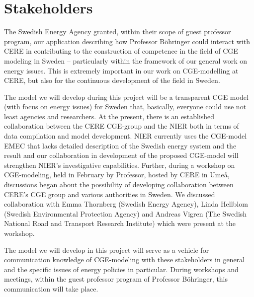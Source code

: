 \section{Stakeholders}
The Swedish Energy Agency granted, within their scope of guest professor program, our application describing how Professor Böhringer could interact with CERE in contributing to the construction of competence in the field of CGE modeling in Sweden – particularly within the framework of our general work on energy issues. This is extremely important in our work on CGE-modelling at CERE, but also for the continuous development of the field in Sweden.

The model we will develop during this project will be a transparent CGE model (with focus on energy issues) for Sweden that, basically, everyone could use not least agencies and researchers. At the present, there is an established collaboration between the CERE CGE-group and the NIER both in terms of data compilation and model development. NIER currently uses the CGE-model EMEC that lacks detailed description of the Swedish energy system and the result and our collaboration in development of the proposed CGE-model will strengthen NIER's investigative capabilities. Further, during a workshop on CGE-modeling, held in February by Professor, hosted by CERE in Umeå, discussions began about the possibility of developing collaboration between CERE's CGE group and various authorities in Sweden. We discussed collaboration with Emma Thornberg (Swedish Energy Agency), Linda Hellblom (Swedish Environmental Protection Agency) and Andreas Vigren (The Swedish National Road and Transport Research Institute) which were present at the workshop.

The model we will develop in this project will serve as a vehicle for communication knowledge of CGE-modeling with these stakeholders in general and the specific issues of energy policies in particular. During workshops and meetings, within the guest professor program of Professor Böhringer, this communication will take place.

